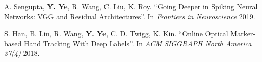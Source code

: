 \documentclass[margin,line]{res}
\begin{document}
\begin{resume}





\vspace*{-.1in}
A. Sengupta, {\bf Y. Ye}, R. Wang, C. Liu, K. Roy. ``Going Deeper in Spiking Neural Networks: VGG and Residual Architectures''. In {\em Frontiers in Neuroscience} 2019.

\vspace*{-.1in}
S. Han, B. Liu, R. Wang, {\bf Y. Ye}, C. D. Twigg, K. Kin. ``Online Optical Marker-based Hand Tracking With Deep Labels''. In {\em ACM SIGGRAPH North America 37(4)} 2018.





\end{resume}
\end{document}
